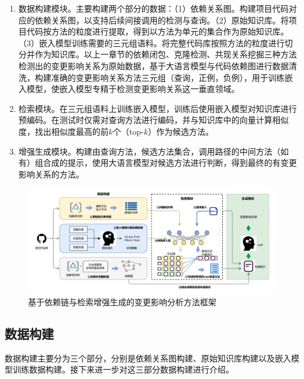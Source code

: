 \begin{enumerate}

    \item 数据构建模块。主要构建两个部分的数据：（1）依赖关系图。构建项目代码对应的依赖关系图，以支持后续间接调用的检测与查询。（2）原始知识库。将项目代码按方法的粒度进行提取，得到以方法为单元的集合作为原始知识库。（3）嵌入模型训练需要的三元组语料。将完整代码库按照方法的粒度进行切分并作为知识库。以上一章节的依赖闭包、克隆检测、共现关系挖掘三种方法检测出的变更影响关系为原始数据，基于大语言模型与代码依赖图进行数据清洗，构建准确的变更影响关系方法三元组（查询，正例，负例），用于训练嵌入模型，使嵌入模型专精于检测变更影响关系这一垂直领域。

    \item 检索模块。在三元组语料上训练嵌入模型，训练后使用嵌入模型对知识库进行预编码。在测试时仅需对查询方法进行编码，并与知识库中的向量计算相似度，找出相似度最高的前$k$个（top-$k$）作为候选方法。
    
    \item 增强生成模块。构建由查询方法，候选方法集合，调用路径的中间方法（如有）组合成的提示，使用大语言模型对候选方法进行判断，得到最终的有变更影响关系的方法。
    
\end{enumerate}

\begin{figure}[htbp]
\centering
\includegraphics[width = 1\textwidth]{figures/3_第三章框架.pdf}
\caption{基于依赖链与检索增强生成的变更影响分析方法框架}
\label{2_基于代码依赖与检索增强生成的变更影响分析方法框架}
\end{figure}


\subsection{数据构建}
\label{3_数据构建}

数据构建主要分为三个部分，分别是依赖关系图构建、原始知识库构建以及嵌入模型训练数据构建。接下来进一步对这三部分数据构建进行介绍。


